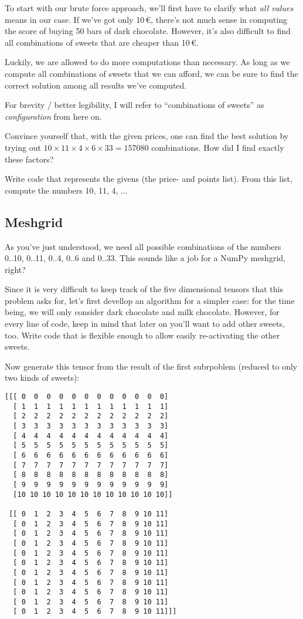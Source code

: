 \documentclass[
	english,
	fontsize=10pt,
	parskip=half,
	titlepage=true,
	DIV=12
]{scrartcl}
\begin{document}
To start with our brute force approach, we'll first have to clarify what \emph{all values} means in our case. If we've got only 10\,€, there's not much sense in computing the score of buying 50 bars of dark chocolate. However, it's also difficult to find all combinations of sweets that are cheaper than 10\,€.

Luckily, we are allowed to do more computations than necessary. As long as we compute all combinations of sweets that we can afford, we can be sure to find the correct solution among all results we've computed.

For brevity / better legibility, I will refer to \enquote{combinations of sweets} as \emph{configuration} from here on.

Convince yourself that, with the given prices, one can find the best solution by trying out $10 \times 11 \times 4 \times 6 \times 33 = 157080$ combinations. How did I find exactly these factors?

Write code that represents the givens (the price- and points list). From this list, compute the numbers 10, 11, 4, ...

\subsection*{Meshgrid}
As you've just understood, we need all possible combinations of the numbers 0..10, 0..11, 0..4, 0..6 and 0..33. This sounds like a job for a NumPy meshgrid, right?

Since it is very difficult to keep track of the five dimensional tensors that this problem asks for, let's first devellop an algorithm for a simpler case: for the time being, we will only consider dark chocolate and milk chocolate. However, for every line of code, keep in mind that later on you'll want to add other sweets, too. Write code that is flexible enough to allow easily re-activating the other sweets.

Now generate this tensor from the result of the first subrpoblem (reduced to only two kinds of sweets):
\begin{verbatim}
[[[ 0  0  0  0  0  0  0  0  0  0  0  0]
  [ 1  1  1  1  1  1  1  1  1  1  1  1]
  [ 2  2  2  2  2  2  2  2  2  2  2  2]
  [ 3  3  3  3  3  3  3  3  3  3  3  3]
  [ 4  4  4  4  4  4  4  4  4  4  4  4]
  [ 5  5  5  5  5  5  5  5  5  5  5  5]
  [ 6  6  6  6  6  6  6  6  6  6  6  6]
  [ 7  7  7  7  7  7  7  7  7  7  7  7]
  [ 8  8  8  8  8  8  8  8  8  8  8  8]
  [ 9  9  9  9  9  9  9  9  9  9  9  9]
  [10 10 10 10 10 10 10 10 10 10 10 10]]

 [[ 0  1  2  3  4  5  6  7  8  9 10 11]
  [ 0  1  2  3  4  5  6  7  8  9 10 11]
  [ 0  1  2  3  4  5  6  7  8  9 10 11]
  [ 0  1  2  3  4  5  6  7  8  9 10 11]
  [ 0  1  2  3  4  5  6  7  8  9 10 11]
  [ 0  1  2  3  4  5  6  7  8  9 10 11]
  [ 0  1  2  3  4  5  6  7  8  9 10 11]
  [ 0  1  2  3  4  5  6  7  8  9 10 11]
  [ 0  1  2  3  4  5  6  7  8  9 10 11]
  [ 0  1  2  3  4  5  6  7  8  9 10 11]
  [ 0  1  2  3  4  5  6  7  8  9 10 11]]]
\end{verbatim}
\end{document}
